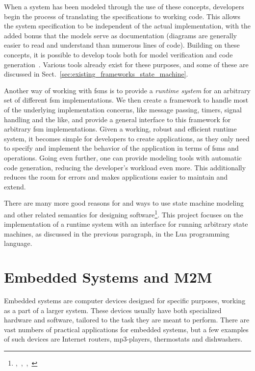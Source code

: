When a system has been modeled through the use of these concepts, developers begin the process of translating the specifications to working code. This allows the system specification to be independent of the actual implementation, with the added bonus that the models serve as documentation (diagrams are generally easier to read and understand than numerous lines of code). Building on these concepts, it is possible to develop tools both for model verification and code generation~\cite{article:compositional_arctis}. Various tools already exist for these purposes, and some of these are discussed in Sect.~\ref{sec:existing_frameworks_state_machine}.

Another way of working with \glspl{fsm} is to provide a \emph{runtime system} for an arbitrary set of different \gls{fsm} implementations. We then create a framework to handle most of the underlying implementation concerns, like message passing, timers, signal handling and the like, and provide a general interface to this framework for arbitrary \gls{fsm} implementations. Given a working, robust and efficient runtime system, it becomes simple for developers to create applications, as they only need to specify and implement the behavior of the application in terms of \glspl{fsm} and operations. Going even further, one can provide modeling tools with automatic code generation, reducing the developer's workload even more. This additionally reduces the room for errors and makes applications easier to maintain and extend.

There are many more good reasons for and ways to use state machine modeling and other related semantics for designing software\footnote{\cite{article:itut_methodologies},~\cite{chapter:structural_modeling_uml},~\cite{conference:system_analysis_modeling},~\cite{phd:frank}}. This project focuses on the implementation of a runtime system with an interface for running arbitrary state machines, as discussed in the previous paragraph, in the Lua programming language.

\section{Embedded Systems and M2M}
\label{sec:embedded_m2m}
Embedded systems are computer devices designed for specific purposes, working as a part of a larger system. These devices usually have both specialized hardware and software, tailored to the task they are meant to perform. There are vast numbers of practical applications for embedded systems, but a few examples of such devices are Internet routers, mp3-players, thermostats and dishwashers.

